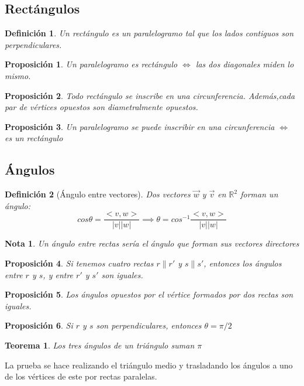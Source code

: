 \documentclass[11pt, a4paper, titlepage]{article}
\makeatletter
\renewenvironment{proof}[1][\proofname] {\vspace{-15pt}\par\pushQED{\qed}\normalfont\topsep6\p@\@plus6\p@\relax\trivlist\item[\hskip\labelsep\it#1\@addpunct{.}]\ignorespaces}{\popQED\endtrivlist\@endpefalse}
\newcommand{\R}{\mathbb{R}}
\renewcommand{\vec}{\overrightarrow}
\theoremstyle{theorem-style}
\newtheorem*{nth}{Teorema}
\newtheorem*{nprop}{Proposición}
\theoremstyle{definition-style}
\newtheorem*{ndef}{Definición}
\theoremstyle{remark-style}
\newtheorem*{nota}{Nota}
\theoremstyle{example-style}
\makeatother
\begin{document}
\subsection{Rectángulos}
\begin{ndef}
	Un rectángulo es un paralelogramo tal que los lados contiguos son perpendiculares.
\end{ndef}

\begin{nprop}
	Un paralelogramo es rectángulo $\iff$ las dos diagonales miden lo mismo.
\end{nprop}

\begin{nprop}
	Todo rectángulo se inscribe en una circunferencia. Además,cada par de vértices opuestos son diametralmente opuestos.
\end{nprop}

\begin{nprop}
	Un paralelogramo se puede inscribir en una circunferencia $\iff$ es un rectángulo
\end{nprop}

\subsection{Ángulos}

\begin{ndef}[Ángulo entre vectores]
	Dos vectores $\vec{w}$ y $\vec{v}$ en $\R^2$ forman un ángulo:
	\[
	cos \theta =  \frac{< v,w >}{|v||w|} \implies \theta = cos^{-1} \frac{< v,w >}{|v||w|}
	\]
\end{ndef}
\begin{nota}
	Un ángulo entre rectas sería el ángulo que forman sus vectores directores
\end{nota}
\begin{nprop}
	Si tenemos cuatro rectas $r \parallel r'$ y $s \parallel s'$, entonces los ángulos entre $r$ y $s$, y entre $r'$ y $s'$ son iguales.
\end{nprop}

\begin{nprop}
	Los ángulos opuestos por el vértice formados por dos rectas son iguales.
\end{nprop}

\begin{nprop}
	Si $r$ y $s$ son perpendiculares, entonces $\theta = \pi/2$
\end{nprop}

\begin{nth}
	Los tres ángulos de un triángulo suman $\pi$
\end{nth}
\begin{proof}
	La prueba se hace realizando el triángulo medio y trasladando los ángulos a uno de los vértices de este por rectas paralelas.
\end{proof}
\end{document}
